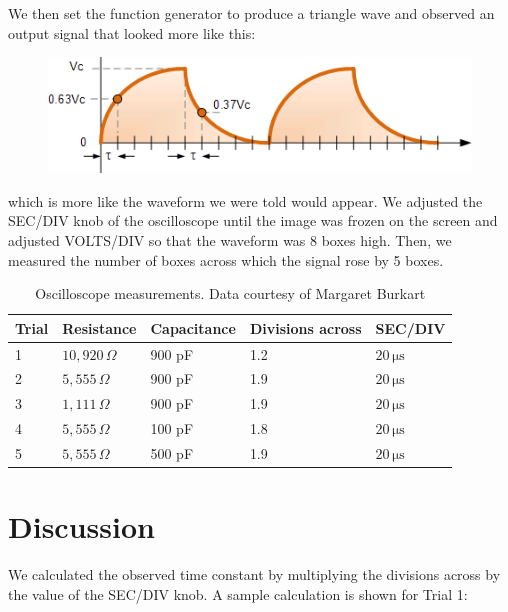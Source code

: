 \documentclass[11pt, titlepage, letterpaper, twoside]{article}
\begin{document}
We then set the function generator to produce a triangle wave and observed an output signal that
looked more like this:

\begin{figure}[h!]
  \includegraphics[scale=0.5]{rc_normal}
\end{figure}

\noindent which is more like the waveform we were told would appear. We adjusted the SEC/DIV knob of the
oscilloscope until the image was frozen on the screen and adjusted VOLTS/DIV so that the waveform
was 8 boxes high. Then, we measured the number of boxes across which the signal rose by 5 boxes.

\begin{table}[h!]
\centering
\caption{Oscilloscope measurements. Data courtesy of Margaret Burkart}
\label{observations}
\begin{tabular}{|l|l|l|l|l|}
\hline
Trial & Resistance       & Capacitance & Divisions across & SEC/DIV              \\ \hline
1     & $10,920\,\Omega$ & 900 pF      & 1.2              & $20\,\mathrm{\mu s}$ \\ \hline
2     & $5,555\,\Omega$  & 900 pF      & 1.9              & $20\,\mathrm{\mu s}$ \\ \hline
3     & $1,111\,\Omega$  & 900 pF      & 1.9              & $20\,\mathrm{\mu s}$ \\ \hline
4     & $5,555\,\Omega$  & 100 pF      & 1.8              & $20\,\mathrm{\mu s}$ \\ \hline
5     & $5,555\,\Omega$  & 500 pF      & 1.9              & $20\,\mathrm{\mu s}$ \\ \hline
\end{tabular}
\end{table}

\section{Discussion}

We calculated the observed time constant by multiplying the divisions across by the value of the SEC/DIV knob.
A sample calculation is shown for Trial 1:
\end{document}
